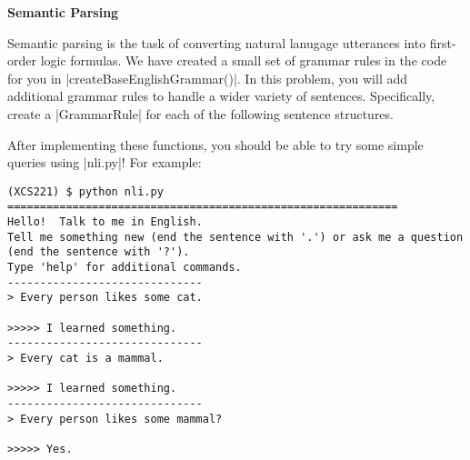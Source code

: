 \item {\bf Semantic Parsing}

Semantic parsing is the task of converting natural lanugage utterances into
first-order logic formulas. We have created a small set of grammar rules in the
code for you in |createBaseEnglishGrammar()|. In this problem, you will add
additional grammar rules to handle a wider variety of sentences. Specifically,
create a |GrammarRule| for each of the following sentence structures.

\begin{enumerate}

  

  

  

\end{enumerate}

After implementing these functions, you should be able to try some simple
queries using |nli.py|! For example:
\begin{lstlisting}
(XCS221) $ python nli.py
============================================================
Hello!  Talk to me in English.
Tell me something new (end the sentence with '.') or ask me a question (end the sentence with '?').
Type 'help' for additional commands.
------------------------------
> Every person likes some cat.

>>>>> I learned something.
------------------------------
> Every cat is a mammal.

>>>>> I learned something.
------------------------------
> Every person likes some mammal?

>>>>> Yes.
\end{lstlisting}
